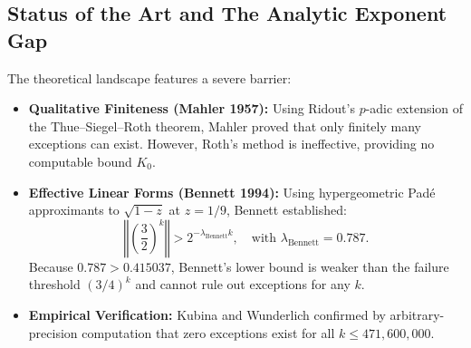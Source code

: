 \documentclass[11pt,reqno]{amsart}
\theoremstyle{definition}
\numberwithin{equation}{section}
\begin{document}
\subsection{Status of the Art and The Analytic Exponent Gap}
The theoretical landscape features a severe barrier:
\begin{itemize}
    \item \textbf{Qualitative Finiteness (Mahler 1957):} Using Ridout's $p$-adic extension of the Thue--Siegel--Roth theorem, Mahler \cite{mahler1957} proved that only finitely many exceptions can exist. However, Roth's method is ineffective, providing no computable bound $K_0$.
    \item \textbf{Effective Linear Forms (Bennett 1994):} Using hypergeometric Padé approximants to $\sqrt{1 - z}$ at $z = 1/9$, Bennett \cite{bennett1994} established:
    \begin{equation}\label{eq:bennett_bound}
    \left\Vert \left(\frac{3}{2}\right)^k \right\Vert > 2^{-\lambda_{\mathrm{Bennett}} k}, \quad \text{with } \lambda_{\mathrm{Bennett}} = 0.787.
    \end{equation}
    Because $0.787 > 0.415037$, Bennett's lower bound is weaker than the failure threshold $(3/4)^k$ and cannot rule out exceptions for any $k$.
    \item \textbf{Empirical Verification:} Kubina and Wunderlich \cite{kubina1990} confirmed by arbitrary-precision computation that zero exceptions exist for all $k \le 471{,}600{,}000$.
\end{itemize}
\end{document}
